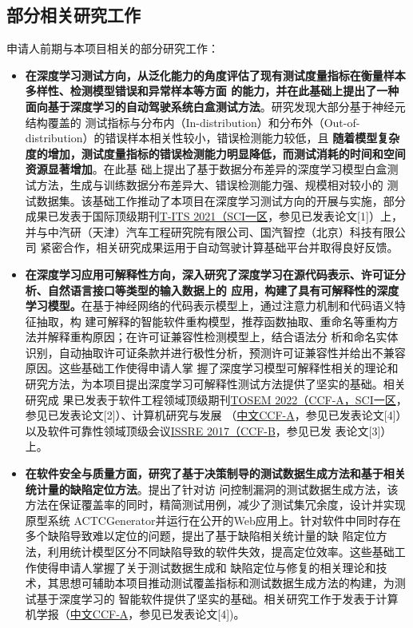 \documentclass[a4paper,zihao=-4]{article}
\begin{document}
\subsection{部分相关研究工作}


申请人前期与本项目相关的部分研究工作：

\begin{itemize}
  \item \textbf{在深度学习测试方向，从泛化能力的角度评估了现有测试度量指标在衡量样本多样性、检测模型错误和异常样本等方面
          的能力，并在此基础上提出了一种面向基于深度学习的自动驾驶系统白盒测试方法}。研究发现大部分基于神经元结构覆盖的
        测试指标与分布内（In-distribution）和分布外（Out-of-distribution）的错误样本相关性较小，错误检测能力较低，且
        \textbf{随着模型复杂度的增加，测试度量指标的错误检测能力明显降低，而测试消耗的时间和空间资源显著增加}。在此基
        础上提出了基于数据分布差异的深度学习模型白盒测试方法，生成与训练数据分布差异大、错误检测能力强、规模相对较小的
        测试数据集。该基础工作推动了本项目在深度学习测试方向的开展与实施，部分成果已发表于国际顶级期刊\underline{T-ITS
          2021（SCI一区}，参见已发表论文[1]）上，并与中汽研（天津）汽车工程研究院有限公司、国汽智控（北京）科技有限公司
        紧密合作，相关研究成果运用于自动驾驶计算基础平台并取得良好反馈。

  \item \textbf{在深度学习应用可解释性方向，深入研究了深度学习在源代码表示、许可证分析、自然语言接口等类型的输入数据上的
          应用，构建了具有可解释性的深度学习模型。}在基于神经网络的代码表示模型上，通过注意力机制和代码语义特征抽取，构
        建可解释的智能软件重构模型，推荐函数抽取、重命名等重构方法并解释重构原因；在许可证兼容性检测模型上，结合语法分
        析和命名实体识别，自动抽取许可证条款并进行极性分析，预测许可证兼容性并给出不兼容原因。这些基础工作使得申请人掌
        握了深度学习模型可解释性相关的理论和研究方法，为本项目提出深度学习可解释性测试方法提供了坚实的基础。相关研究成
        果已发表于软件工程领域顶级期刊\underline{TOSEM 2022（CCF-A，SCI一区}，参见已发表论文[2]）、计算机研究与发展
        （\underline{中文CCF-A}，参见已发表论文[4]）以及软件可靠性领域顶级会议\underline{ISSRE 2017（CCF-B}，参见已发
        表论文[3]）上。

  \item \textbf{在软件安全与质量方面，研究了基于决策制导的测试数据生成方法和基于相关统计量的缺陷定位方法}。提出了针对访
        问控制漏洞的测试数据生成方法，该方法在保证覆盖率的同时，精简测试用例，减少了测试集冗余度，设计并实现原型系统
        ACTCGenerator并运行在公开的Web应用上。针对软件中同时存在多个缺陷导致难以定位的问题，提出了基于缺陷相关统计量的缺
        陷定位方法，利用统计模型区分不同缺陷导致的软件失效，提高定位效率。这些基础工作使得申请人掌握了关于测试数据生成和
        缺陷定位与修复的相关理论和技术，其思想可辅助本项目推动测试覆盖指标和测试数据生成方法的构建，为测试基于深度学习的
        智能软件提供了坚实的基础。相关研究工作于发表于计算机学报（\underline{中文CCF-A}，参见已发表论文[4])。
\end{itemize}
\end{document}
